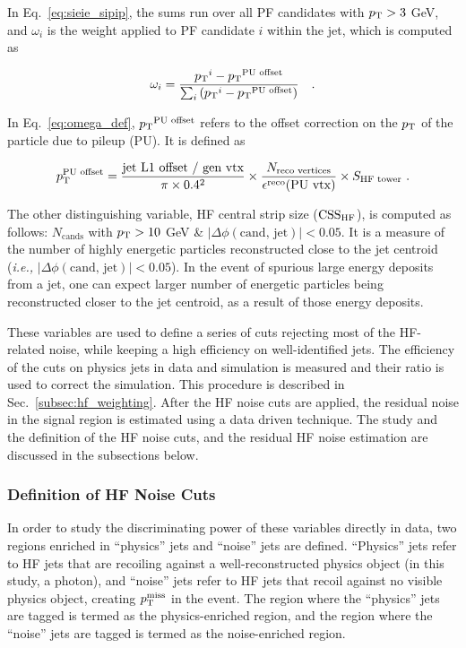 In Eq.~\ref{eq:sieie_sipip}, the sums run over all PF candidates with $p_{\textrm{T}} > 3$ GeV, and 
$\omega_i$ is the weight applied to PF candidate $i$ within the jet, which is computed as

\begin{equation}
    \omega_i = \frac{{p_{\textrm{T}}}^i - {p_{\textrm{T}}}^{\text{PU offset}}}{\sum_{i} \left( {p_{\textrm{T}}}^{i} - {p_{\textrm{T}}}^{\text{PU offset}} \right) } \quad .
    \label{eq:omega_def}
\end{equation}

In Eq.~\ref{eq:omega_def}, ${p_{\textrm{T}}}^{\text{PU offset}}$ refers to the offset correction on the $p_{\textrm{T}}$ of the particle 
due to pileup (PU). It is defined as

\begin{equation}
    p_{\textrm{T}}^{\text{PU offset}} = \frac{\text{jet L1 offset / gen vtx}}{\pi \times 0.4^2} \times \frac{N_{\text{reco vertices}}}{\epsilon^{\text{reco}}(\text{PU vtx})} \times S_{\text{HF tower}} \ .
\end{equation}

The other distinguishing variable, HF central strip size ($\mathrm{CSS_{HF}}$), is computed as follows: 
$N_{\textrm{cands}}$ with $p_{\textrm{T}} > 10$ GeV \& $|\Delta\phi(\textrm{cand, jet})| < 0.05$. It is a measure of the number of
highly energetic particles reconstructed close to the jet centroid (\textit{i.e.,} $|\Delta\phi(\textrm{cand, jet})| < 0.05$).
In the event of spurious large energy deposits from a jet, one can expect larger number of energetic particles
being reconstructed closer to the jet centroid, as a result of those energy deposits.

These variables are used to define a series of cuts rejecting most of the HF-related noise, while keeping a high efficiency on well-identified jets. 
The efficiency of the cuts on physics jets in data and simulation is measured and their ratio is used to correct the simulation.
This procedure is described in Sec.~\ref{subsec:hf_weighting}. After the HF noise cuts are applied, the residual noise in the signal region is estimated using a data driven technique.
The study and the definition of the HF noise cuts, and the residual HF noise estimation are discussed in the subsections below. 

\subsubsection{Definition of HF Noise Cuts}

In order to study the discriminating power of these variables directly in data, two regions enriched in ``physics'' jets and ``noise'' jets are defined. ``Physics'' jets
refer to HF jets that are recoiling against a well-reconstructed physics object (in this study, a photon), and ``noise'' jets 
refer to HF jets that recoil against no visible physics object, creating $p_{\textrm{T}}^{\textrm{miss}}$ in the event. The region where the ``physics'' jets are tagged
is termed as the physics-enriched region, and the region where the ``noise'' jets are tagged is termed as the noise-enriched region.

